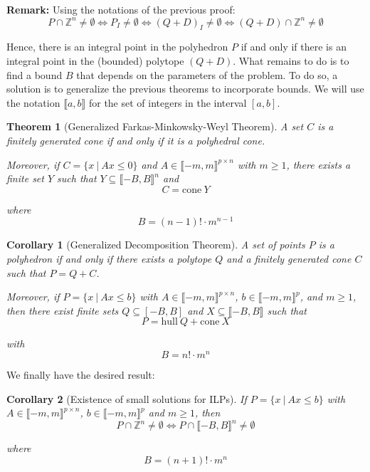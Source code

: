 \documentclass{article}
\newcommand{\cone}{\mathrm{cone}}
\newcommand{\hull}{\mathrm{hull}}
\newcommand{\ints}{\mathbb{Z}}
\newcommand{\ifff}{if and only if}
\newtheorem{theorem}{Theorem}
\newtheorem{corollary}{Corollary}
\begin{document}
\textbf{Remark:}
Using the notations of the previous proof:
\begin{displaymath}
  P \cap \ints^n \neq \emptyset \Longleftrightarrow
  P_I \neq \emptyset            \Longleftrightarrow
  (Q + D)_I \neq \emptyset      \Longleftrightarrow
  (Q + D) \cap \ints^n \neq \emptyset
\end{displaymath}

Hence, there is an integral point in the polyhedron $P$ \ifff{} there is an
integral point in the (bounded) polytope $(Q + D)$.
What remains to do is to find a bound $B$ that depends on the
parameters of the problem. To do so, a solution is to generalize the previous
theorems to incorporate bounds. We will use the notation
$\llbracket a, b \rrbracket$ for the set of integers in the interval $[a, b]$.

\begin{theorem}[Generalized Farkas-Minkowsky-Weyl Theorem]
  A set $C$ is a finitely generated cone \ifff{} it is a polyhedral cone.

  Moreover, if $C = \{x~|~Ax \leqslant 0\}$ and
  $A \in \llbracket -m, m \rrbracket^{p \times n}$ with $m \geqslant 1$,
  there exists a finite set $Y$ such that
  $Y \subseteq \llbracket -B, B \rrbracket^n$
  and $$C = \cone~Y$$
  
  where
  $$B = (n - 1)! \cdot m^{n-1}$$
\end{theorem}

\begin{corollary}[Generalized Decomposition Theorem]
  A set of points $P$ is a polyhedron \ifff{} there exists a polytope $Q$ and a
  finitely generated cone $C$ such that $P = Q + C$.

  Moreover, if $P = \{x~|~Ax \leqslant b\}$ with
  $A \in \llbracket -m, m \rrbracket^{p \times n}$,
  $b \in \llbracket -m, m \rrbracket^p$, and $m \geqslant 1$,
  then there exist finite sets
  $Q \subseteq [-B, B]$ and $X \subseteq \llbracket -B, B \rrbracket$ such that
  $$P = \hull~Q + \cone~X$$
  
  with $$B = n! \cdot m^n$$
\end{corollary}

We finally have the desired result:

\begin{corollary}[Existence of small solutions for ILPs]
  \label{small-ilp}
  If $P = \{x~|~Ax \leqslant b\}$ with
  $A \in \llbracket -m, m \rrbracket^{p \times n}$,
  $b \in \llbracket -m, m \rrbracket^p$ and $m \geqslant 1$, then
  $$P \cap \ints^n \neq \emptyset \Longleftrightarrow
  P \cap \llbracket -B, B \rrbracket^n \neq \emptyset$$
  
  where
  $$B = (n + 1)! \cdot m^n$$
\end{corollary}
\end{document}

